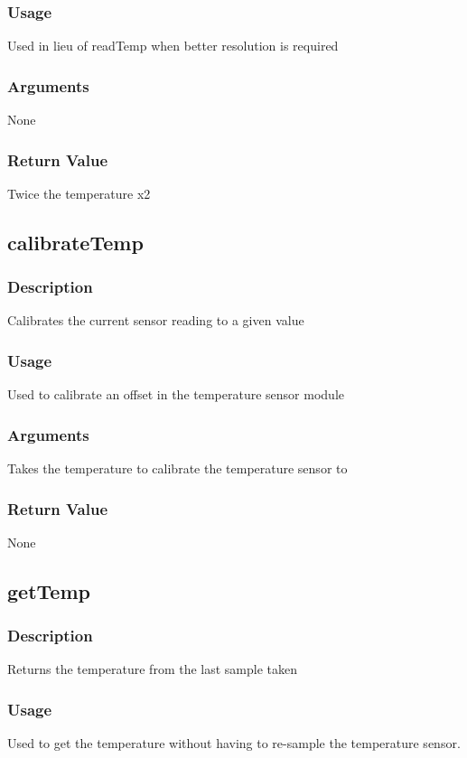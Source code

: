 \documentclass[]{report}
\begin{document}
\subsubsection{Usage}
Used in lieu of readTemp when better resolution is required

\subsubsection{Arguments}
None

\subsubsection{Return Value}
Twice the temperature x2

\subsection{calibrateTemp}
\subsubsection{Description}
Calibrates the current sensor reading to a given value

\subsubsection{Usage}
Used to calibrate an offset in the temperature sensor module

\subsubsection{Arguments}
Takes the temperature to calibrate the temperature sensor to

\subsubsection{Return Value}
None

\subsection{getTemp}
\subsubsection{Description}
Returns the temperature from the last sample taken

\subsubsection{Usage}
Used to get the temperature without having to re-sample the temperature sensor.
\end{document}
